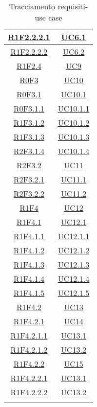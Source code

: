 \begin{longtable}{|c|c|}
	\hline
	\hyperlink{R1F2.2.2.1}{R1F2.2.2.1} & \hyperlink{UC6.1}{UC6.1}\\
	\hline
	\hyperlink{R1F2.2.2.2}{R1F2.2.2.2} & \hyperlink{UC6.2}{UC6.2}\\
	\hline
	\hyperlink{R1F2.4}{R1F2.4} & \hyperlink{UC9}{UC9}\\
	\hline
	\hyperlink{R0F3}{R0F3} & \hyperlink{UC10}{UC10}\\
	\hline
	\hyperlink{R0F3.1}{R0F3.1} & \hyperlink{UC10.1}{UC10.1}\\
	\hline
	\hyperlink{R0F3.1.1}{R0F3.1.1} & \hyperlink{UC10.1.1}{UC10.1.1}\\
	\hline
	\hyperlink{R1F3.1.2}{R1F3.1.2} & \hyperlink{UC10.1.2}{UC10.1.2}\\
	\hline
	\hyperlink{R1F3.1.3}{R1F3.1.3} & \hyperlink{UC10.1.3}{UC10.1.3}\\
	\hline
	\hyperlink{R2F3.1.4}{R2F3.1.4} & \hyperlink{UC10.1.4}{UC10.1.4}\\
	\hline
	\hyperlink{R2F3.2}{R2F3.2} & \hyperlink{UC11}{UC11}\\
	\hline
	\hyperlink{R2F3.2.1}{R2F3.2.1} & \hyperlink{UC11.1}{UC11.1}\\
	\hline
	\hyperlink{R2F3.2.2}{R2F3.2.2} & \hyperlink{UC11.2}{UC11.2}\\
	\hline
	\hyperlink{R1F4}{R1F4} & \hyperlink{UC12}{UC12}\\
	\hline
	\hyperlink{R1F4.1}{R1F4.1} & \hyperlink{UC12.1}{UC12.1}\\
	\hline
	\hyperlink{R1F4.1.1}{R1F4.1.1} & \hyperlink{UC12.1.1}{UC12.1.1}\\
	\hline
	\hyperlink{R1F4.1.2}{R1F4.1.2} & \hyperlink{UC12.1.2}{UC12.1.2}\\
	\hline
	\hyperlink{R1F4.1.3}{R1F4.1.3} & \hyperlink{UC12.1.3}{UC12.1.3}\\
	\hline
	\hyperlink{R1F4.1.4}{R1F4.1.4} & \hyperlink{UC12.1.4}{UC12.1.4}\\
	\hline
	\hyperlink{R1F4.1.5}{R1F4.1.5} & \hyperlink{UC12.1.5}{UC12.1.5}\\
	\hline
	\hyperlink{R1F4.2}{R1F4.2} & \hyperlink{UC13}{UC13}\\
	\hline
	\hyperlink{R1F4.2.1}{R1F4.2.1} & \hyperlink{UC14}{UC14}\\
	\hline
	\hyperlink{R1F4.2.1.1}{R1F4.2.1.1} & \hyperlink{UC13.1}{UC13.1}\\
	\hline
	\hyperlink{R1F4.2.1.2}{R1F4.2.1.2} & \hyperlink{UC13.2}{UC13.2}\\
	\hline
	\hyperlink{R1F4.2.2}{R1F4.2.2} & \hyperlink{UC15}{UC15}\\
	\hline
	\hyperlink{R1F4.2.2.1}{R1F4.2.2.1} & \hyperlink{UC13.1}{UC13.1}\\
	\hline
	\hyperlink{R1F4.2.2.2}{R1F4.2.2.2} & \hyperlink{UC13.2}{UC13.2}\\
	\hline
	\caption[Tracciamento requisiti-use case]{Tracciamento requisiti-use case}
	\label{tabella:requi-usecase}
\end{longtable}
\clearpage

